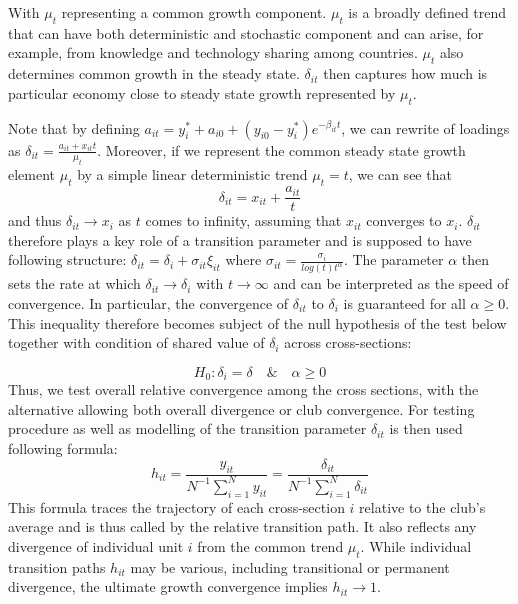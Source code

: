 \documentclass[11pt]{article}
\begin{document}
With $\mu_t$ representing a common growth component.
$\mu_t$ is a broadly defined trend that can have both deterministic and stochastic component and can arise, for example, from knowledge and technology sharing among countries. $\mu_t$ also determines common growth in the steady state. $\delta_{it}$ then captures how much is particular economy close to steady state growth represented by $\mu_t$.

Note that by defining \(a_{it} = y_i^* + a_{i0} + (y_{i0} - y_i^*)e^{-\beta_{it}t} \), we can rewrite of loadings as \(\delta_{it} = \frac{a_{it} + x_{it}t}{\mu_t}\). Moreover, if we represent the common steady state growth element $\mu_t$ by a simple linear deterministic trend \(\mu_t = t\), we can see that
\begin{equation} \label{eq5}\delta_{it} = x_{it} + \frac{a_{it}}{t} \end{equation}  and thus \(\delta_{it} \rightarrow x_i\) as $t$ comes to infinity, assuming that $x_{it}$ converges to $x_{i}$. $\delta_{it}$ therefore plays a key role of a transition parameter and is supposed to have following structure: \(\delta_{it} = \delta_{i} + \sigma_{it}\xi_{it}\) where \( \sigma_{it} = \frac{\sigma_{i}}{log(t)t^\alpha}\). The parameter $\alpha$ then sets the rate at which \(\delta_{it} \rightarrow \delta_{i}\) with \(t \rightarrow \infty\) and can be interpreted as the speed of convergence. In particular, the convergence of $\delta_{it}$ to $\delta_{i}$ is guaranteed for all \(\alpha \geq 0\). This inequality therefore becomes subject of the null hypothesis of the test below together with condition of shared value of $\delta_{i}$ across cross-sections: 

\begin{equation} \label{eq6} H_0: \delta_{i} = \delta \quad \& \quad \alpha \geq 0 \end{equation} Thus, we test overall relative convergence among the cross sections, with the alternative allowing both overall divergence or club convergence.
For testing procedure as well as modelling of the transition parameter $\delta_{it}$ is then used following formula:
\begin{equation}\label{eq8}h_{it} = \frac{y_{it}}{N^{-1}\sum\limits_{i=1}^Ny_{it}} = \frac{\delta_{it}}{N^{-1}\sum\limits_{i=1}^N\delta_{it}}\end{equation}
This formula traces the trajectory of each cross-section $i$ relative to the club's average and is thus called by \citet{phillips2009economic} the relative transition path. It also reflects any divergence of individual unit $i$ from the common trend $\mu_t$. While individual transition paths $h_{it}$ may be various, including transitional or permanent divergence, the ultimate growth convergence implies \(h_{it} \rightarrow 1\).
\end{document}
